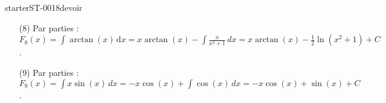 
\begin{corrige}{starterST-0018devoir}

  \begin{enumerate}
  \item[(8)]  Par parties : $F_{8}(x)=\displaystyle\int\arctan (x) \,\mathrm dx = x\arctan (x)-\int \frac{x}{x^2+1}\,dx = x\arctan (x)-\frac{1}{2}\ln(x^2+1) + C$. 
  \item[(9)]  Par parties : $F_{9}(x)=\displaystyle\int x\sin (x) \, dx = -x\cos(x) + \int\cos(x)\, dx = -x\cos(x) +\sin(x) + C$.  


\end{enumerate}
\end{corrige}
